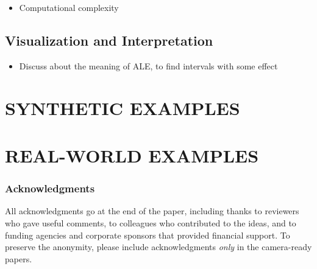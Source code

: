 \documentclass[twoside]{article}
\begin{document}
\noindent

\begin{itemize}
\item Computational complexity
\end{itemize}

\subsection{Visualization and Interpretation}
\label{sec:visualization}

\begin{itemize}
\item Discuss about the meaning of ALE, to find intervals with some effect
\end{itemize}

\section{SYNTHETIC EXAMPLES}

\section{REAL-WORLD EXAMPLES}


\subsubsection*{Acknowledgments}
All acknowledgments go at the end of the paper, including thanks to reviewers who gave useful comments, to colleagues who contributed to the ideas, and to funding agencies and corporate sponsors that provided financial support. 
To preserve the anonymity, please include acknowledgments \emph{only} in the camera-ready papers.


\end{document}
